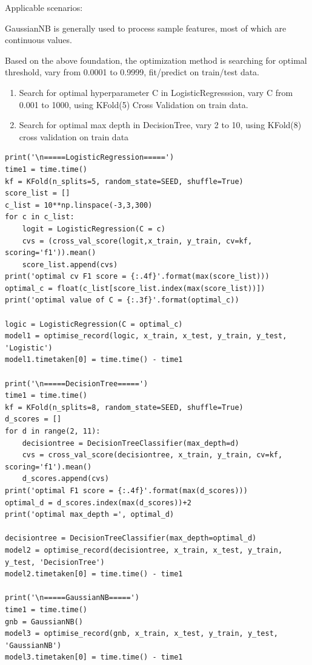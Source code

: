 \documentclass[11pt]{article}
\begin{document}
Applicable scenarios:

GaussianNB is generally used to process sample features, most of which are continuous values.


Based on the above foundation, the optimization method is searching for optimal threshold, vary from 0.0001 to 0.9999, fit/predict on train/test data.

\begin{enumerate}
    \item Search for optimal hyperparameter C in LogisticRegresssion, vary C from 0.001 to 1000, using KFold(5) Cross Validation on train data.
    \item Search for optimal max depth in DecisionTree, vary 2 to 10, using KFold(8) cross validation on train data
\end{enumerate}

\begin{lstlisting}
print('\n=====LogisticRegression=====')
time1 = time.time()
kf = KFold(n_splits=5, random_state=SEED, shuffle=True)  
score_list = []
c_list = 10**np.linspace(-3,3,300)
for c in c_list:
    logit = LogisticRegression(C = c)
    cvs = (cross_val_score(logit,x_train, y_train, cv=kf, scoring='f1')).mean()
    score_list.append(cvs)
print('optimal cv F1 score = {:.4f}'.format(max(score_list)))
optimal_c = float(c_list[score_list.index(max(score_list))])
print('optimal value of C = {:.3f}'.format(optimal_c))

logic = LogisticRegression(C = optimal_c)
model1 = optimise_record(logic, x_train, x_test, y_train, y_test, 'Logistic')
model1.timetaken[0] = time.time() - time1

print('\n=====DecisionTree=====')
time1 = time.time()
kf = KFold(n_splits=8, random_state=SEED, shuffle=True)
d_scores = []
for d in range(2, 11):
    decisiontree = DecisionTreeClassifier(max_depth=d)
    cvs = cross_val_score(decisiontree, x_train, y_train, cv=kf, scoring='f1').mean()
    d_scores.append(cvs)
print('optimal F1 score = {:.4f}'.format(max(d_scores)))   
optimal_d = d_scores.index(max(d_scores))+2   
print('optimal max_depth =', optimal_d)

decisiontree = DecisionTreeClassifier(max_depth=optimal_d)
model2 = optimise_record(decisiontree, x_train, x_test, y_train, y_test, 'DecisionTree')
model2.timetaken[0] = time.time() - time1

print('\n=====GaussianNB=====')
time1 = time.time()
gnb = GaussianNB()
model3 = optimise_record(gnb, x_train, x_test, y_train, y_test, 'GaussianNB')
model3.timetaken[0] = time.time() - time1
\end{lstlisting}
\end{document}
